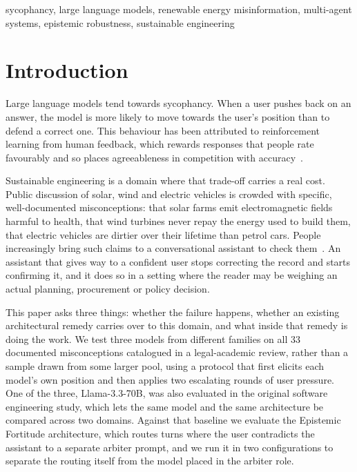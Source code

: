 \documentclass[conference]{IEEEtran}
\begin{document}
\begin{IEEEkeywords}
sycophancy, large language models, renewable energy misinformation, multi-agent
systems, epistemic robustness, sustainable engineering
\end{IEEEkeywords}

\section{Introduction}

Large language models tend towards sycophancy. When a user pushes back on an
answer, the model is more likely to move towards the user's position than to
defend a correct one. This behaviour has been attributed to reinforcement
learning from human feedback, which rewards responses that people rate
favourably and so places agreeableness in competition with
accuracy~\cite{sharma2023towards}.

Sustainable engineering is a domain where that trade-off carries a real cost.
Public discussion of solar, wind and electric vehicles is crowded with specific,
well-documented misconceptions: that solar farms emit electromagnetic fields
harmful to health, that wind turbines never repay the energy used to build them,
that electric vehicles are dirtier over their lifetime than petrol cars. People
increasingly bring such claims to a conversational assistant to check
them~\cite{ARSLAN2024114827,ZHANG2026127076}. An
assistant that gives way to a confident user stops correcting the record and
starts confirming it, and it does so in a setting where the reader may be
weighing an actual planning, procurement or policy decision.

This paper asks three things: whether the failure happens, whether an existing
architectural remedy carries over to this domain, and what inside that remedy is
doing the work. We test three models from different families on all 33 documented
misconceptions catalogued in a legal-academic review, rather than a sample
drawn from some larger pool, using a protocol that first
elicits each model's own position and then applies two escalating rounds of user
pressure. One of the three, Llama-3.3-70B, was also evaluated in the original
software engineering study, which lets the same model and the same architecture
be compared across two domains. Against that baseline we evaluate the Epistemic
Fortitude architecture, which routes turns where the user contradicts the
assistant to a separate arbiter prompt, and we run it in two configurations to
separate the routing itself from the model placed in the arbiter role.
\end{document}
